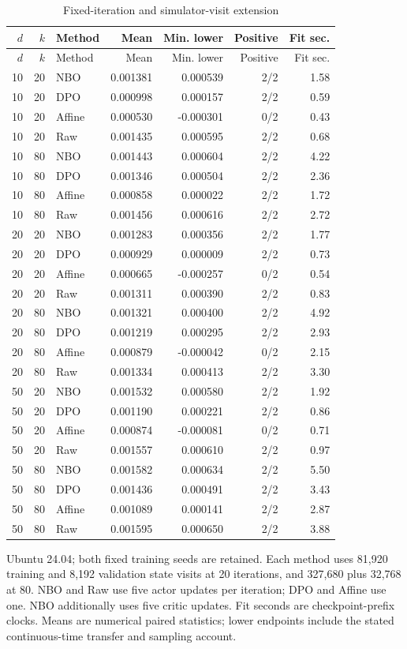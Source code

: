 \begingroup\small\setlength{\tabcolsep}{3pt}
\begin{longtable}{rrlrrrr}
\caption{Fixed-iteration and simulator-visit extension}\label{tab:r14fixed}\\
\toprule
$d$ & $k$ & Method & Mean & Min. lower & Positive & Fit sec.\\\midrule
\endfirsthead
\toprule
$d$ & $k$ & Method & Mean & Min. lower & Positive & Fit sec.\\\midrule
\endhead
10 & 20 & NBO & 0.001381 & 0.000539 & 2/2 & 1.58\\
10 & 20 & DPO & 0.000998 & 0.000157 & 2/2 & 0.59\\
10 & 20 & Affine & 0.000530 & -0.000301 & 0/2 & 0.43\\
10 & 20 & Raw & 0.001435 & 0.000595 & 2/2 & 0.68\\
10 & 80 & NBO & 0.001443 & 0.000604 & 2/2 & 4.22\\
10 & 80 & DPO & 0.001346 & 0.000504 & 2/2 & 2.36\\
10 & 80 & Affine & 0.000858 & 0.000022 & 2/2 & 1.72\\
10 & 80 & Raw & 0.001456 & 0.000616 & 2/2 & 2.72\\
20 & 20 & NBO & 0.001283 & 0.000356 & 2/2 & 1.77\\
20 & 20 & DPO & 0.000929 & 0.000009 & 2/2 & 0.73\\
20 & 20 & Affine & 0.000665 & -0.000257 & 0/2 & 0.54\\
20 & 20 & Raw & 0.001311 & 0.000390 & 2/2 & 0.83\\
20 & 80 & NBO & 0.001321 & 0.000400 & 2/2 & 4.92\\
20 & 80 & DPO & 0.001219 & 0.000295 & 2/2 & 2.93\\
20 & 80 & Affine & 0.000879 & -0.000042 & 0/2 & 2.15\\
20 & 80 & Raw & 0.001334 & 0.000413 & 2/2 & 3.30\\
50 & 20 & NBO & 0.001532 & 0.000580 & 2/2 & 1.92\\
50 & 20 & DPO & 0.001190 & 0.000221 & 2/2 & 0.86\\
50 & 20 & Affine & 0.000874 & -0.000081 & 0/2 & 0.71\\
50 & 20 & Raw & 0.001557 & 0.000610 & 2/2 & 0.97\\
50 & 80 & NBO & 0.001582 & 0.000634 & 2/2 & 5.50\\
50 & 80 & DPO & 0.001436 & 0.000491 & 2/2 & 3.43\\
50 & 80 & Affine & 0.001089 & 0.000141 & 2/2 & 2.87\\
50 & 80 & Raw & 0.001595 & 0.000650 & 2/2 & 3.88\\
\bottomrule\end{longtable}
\noindent Ubuntu 24.04; both fixed training seeds are retained. Each method uses 81,920 training and 8,192 validation state visits at 20 iterations, and 327,680 plus 32,768 at 80. NBO and Raw use five actor updates per iteration; DPO and Affine use one. NBO additionally uses five critic updates. Fit seconds are checkpoint-prefix clocks. Means are numerical paired statistics; lower endpoints include the stated continuous-time transfer and sampling account.
\endgroup
